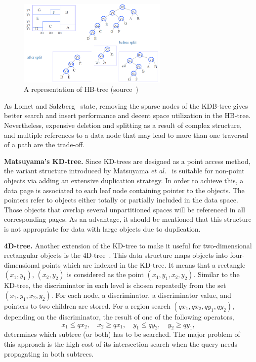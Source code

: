 \documentclass[a4paper,12pt]{article}
\begin{document}
\begin{figure}
\centering
\includegraphics[width=0.65\textwidth,height=0.2\textheight]{hbtree}
\caption{A representation of HB-tree (source~\cite{hbtree1})}
\label{fighbtree}
\end{figure}

As Lomet and Salzberg~\cite{hbtree1} state, removing the sparse nodes of the KDB-tree gives better search and insert performance and decent space utilization in the HB-tree. Nevertheless, expensive deletion and splitting as a result of complex structure, and multiple references to a data node that may lead to more than one traversal of a path are the trade-off.

\textbf{Matsuyama's KD-tree.} Since KD-trees are designed as a point access method, the variant structure introduced by Matsuyama \emph{et al.}~\cite{matsuyama} is suitable for non-point objects via adding an extensive duplication strategy. In order to achieve this, a data page is associated to each leaf node containing pointer to the objects. The pointers refer to objects either totally or partially included in the data space. Those objects that overlap several unpartitioned spaces will be referenced in all corresponding pages. As an advantage, it should be mentioned that this structure is not appropriate for data with large objects due to duplication.

\textbf{4D-tree.} Another extension of the KD-tree to make it useful for two-dimensional rectangular objects is the 4D-tree~\cite{4dtree}. This data structure maps objects into four-dimensional points which are indexed in the KD-tree. It means that a rectangle $(x‍‍_1, y_1)$, $(x_2, y_2)$ is considered as the point $(x‍‍_1, y_1, x_2, y_2)$. Similar to the KD-tree, the discriminator in each level is chosen repeatedly from the set $(x‍‍_1, y_1, x_2, y_2)$. For each node, a discriminator, a discriminator value, and pointers to two children are stored. 
For a region search $(qx_1, qx_2, qy_1, qy_2)$, depending on the discriminator, the result of one of the following operators,
$$x_1 \leq qx_2, \quad x_2 \geq qx_1, \quad y_1 \leq qy_2, \quad y_2 \geq qy_1,$$ 
determines which subtree (or both) has to be searched.
The major problem of this approach is the high cost of its intersection search when the query needs propagating in both subtrees. 
\end{document}
